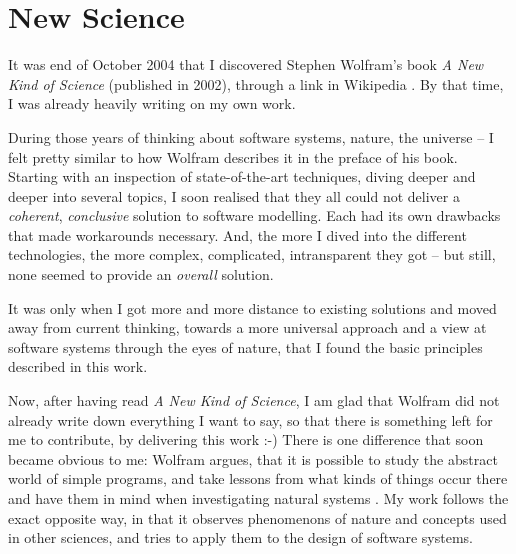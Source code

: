 %
%
%
%
%
%
%

\section*{New Science}
\label{new_science_heading}

It was end of October 2004 that I discovered Stephen Wolfram's book
\emph{A New Kind of Science} \cite{wolfram} (published in 2002), through a link
in Wikipedia \cite{wikipedia}. By that time, I was already heavily writing on
my own work.

During those years of thinking about software systems, nature, the universe --
I felt pretty similar to how Wolfram describes it in the preface of his book.
Starting with an inspection of state-of-the-art techniques, diving deeper and
deeper into several topics, I soon realised that they all could not deliver a
\emph{coherent}, \emph{conclusive} solution to software modelling. Each had its
own drawbacks that made workarounds necessary. And, the more I dived into the
different technologies, the more complex, complicated, intransparent they got
-- but still, none seemed to provide an \emph{overall} solution.

It was only when I got more and more distance to existing solutions and moved
away from current thinking, towards a more universal approach and a view at
software systems through the eyes of nature, that I found the basic principles
described in this work.

Now, after having read \emph{A New Kind of Science}, I am glad that Wolfram did
not already write down everything I want to say, so that there is something left
for me to contribute, by delivering this work :-) There is one difference that
soon became obvious to me: Wolfram argues, that it is possible to study the
abstract world of simple programs, and take lessons from what kinds of things
occur there and have them in mind when investigating natural systems
\cite{wikipedia}. My work follows the exact opposite way, in that it observes
phenomenons of nature and concepts used in other sciences, and tries to apply
them to the design of software systems.

